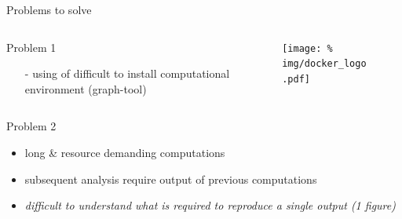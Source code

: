 \begin{frame}{Problems to solve}

  \vspace{-0.5cm}
  
  \begin{columns}
    \begin{column}{.6\textwidth}
      \minipage[c][0.2\textheight][s]{\columnwidth}

      \vfill
      
      Problem 1 

      \begin{itemize}[leftmargin=0.6cm]
        
      \item[-] using of difficult to install computational environment (graph-tool)       
        
      \end{itemize}

      \vfill
      
      
      \endminipage      
    \end{column}
    \begin{column}{.4\textwidth}



      \begin{figure}
        \centering
        \texttt{[image: \%
          img/docker\_logo.pdf]} %
      \end{figure}
      



      
    \end{column}
  \end{columns}


  \vspace{-0.3cm}
  \begin{columns}
    \begin{column}{.6\textwidth}
      \minipage[c][0.5\textheight][s]{\columnwidth}

      \vfill
      
      Problem 2        

      \begin{itemize}[leftmargin=0.6cm]
        
      \item<3->[-] long \& resource demanding computations
      \item<4->[-] subsequent analysis require output of previous computations \vspace{0.17cm}
      \item<5->[] \textit{difficult to understand what is required to reproduce a single output (1 figure)}
        

\end{itemize}
\end{column}
\end{columns}
\end{frame}
